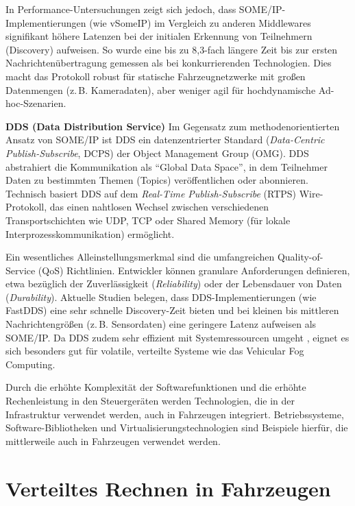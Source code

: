 In Performance-Untersuchungen zeigt sich jedoch, dass SOME/IP-Implementierungen (wie vSomeIP) im Vergleich zu anderen Middlewares signifikant höhere Latenzen bei der initialen Erkennung von Teilnehmern (Discovery) aufweisen. So wurde eine bis zu 8,3-fach längere Zeit bis zur ersten Nachrichtenübertragung gemessen als bei konkurrierenden Technologien. \cite{Kluener2025} Dies macht das Protokoll robust für statische Fahrzeugnetzwerke mit großen Datenmengen (z.\,B. Kameradaten), aber weniger agil für hochdynamische Ad-hoc-Szenarien.

\textbf{DDS (Data Distribution Service)}
Im Gegensatz zum methodenorientierten Ansatz von SOME/IP ist DDS ein datenzentrierter Standard (\textit{Data-Centric Publish-Subscribe}, DCPS) der Object Management Group (OMG). \cite{OMG2015} DDS abstrahiert die Kommunikation als \enquote{Global Data Space}, in dem Teilnehmer Daten zu bestimmten Themen (Topics) veröffentlichen oder abonnieren.
Technisch basiert DDS auf dem \textit{Real-Time Publish-Subscribe} (RTPS) Wire-Protokoll, das einen nahtlosen Wechsel zwischen verschiedenen Transportschichten wie UDP, TCP oder Shared Memory (für lokale Interprozesskommunikation) ermöglicht. \cite{Kluener2025}

Ein wesentliches Alleinstellungsmerkmal sind die umfangreichen Quality-of-Service (QoS) Richtlinien. Entwickler können granulare Anforderungen definieren, etwa bezüglich der Zuverlässigkeit (\textit{Reliability}) oder der Lebensdauer von Daten (\textit{Durability}). \cite{OMG2015}
Aktuelle Studien belegen, dass DDS-Implementierungen (wie FastDDS) eine sehr schnelle Discovery-Zeit bieten und bei kleinen bis mittleren Nachrichtengrößen (z.\,B. Sensordaten) eine geringere Latenz aufweisen als SOME/IP. \cite{Kluener2025} Da DDS zudem sehr effizient mit Systemressourcen umgeht \cite{Kluener2025}, eignet es sich besonders gut für volatile, verteilte Systeme wie das Vehicular Fog Computing.

Durch die erhöhte Komplexität der Softwarefunktionen und die erhöhte Rechenleistung in den Steuergeräten werden Technologien, die in der  Infrastruktur verwendet werden, auch in Fahrzeugen integriert. Betriebssysteme, Software-Bibliotheken und Virtualisierungstechnologien sind Beispiele hierfür, die mittlerweile auch in Fahrzeugen verwendet werden.

\section{Verteiltes Rechnen in Fahrzeugen}
\label{Verteiltes Rechnen in Fahrzeugen}

